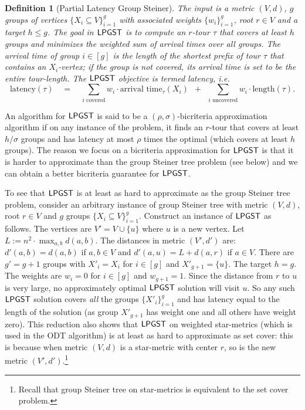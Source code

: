 \documentclass[11pt]{article}
\newtheorem{definition}{Definition}
\def\sse{\subseteq}
\def\odt{{\sf ODT}\xspace}
\def\lpgst{\ensuremath{{\sf LPGST}}\xspace}
\def\ts{\textstyle}
\begin{document}
\begin{definition}[Partial Latency Group Steiner]\label{def:lpgs} The input is 
a metric $(V,d)$, $g$ groups of vertices $\{X_i\sse V\}_{i=1}^g$ with associated weights
$\{w_i\}_{i=1}^g$, root $r\in V$ and a target $h\le g$. The goal in \lpgst is to compute an $r$-tour  $\tau$ 
that covers at least $h$ groups and minimizes the weighted sum of arrival times over all groups. The \emph{arrival  time} of group $i\in[g]$ is the length of the shortest prefix of tour   $\tau$ 
that contains an $X_i$-vertex; if the group is not covered, its arrival time is set to be the entire tour-length. The \lpgst objective  is termed {\em latency}, i.e. 
 \begin{equation}\label{eq:lpgs-obj}
  \ts \text{latency}(\tau) \quad = \quad \sum_{i \text{ covered}} w_i \cdot
  \text{arrival time}_{\tau}(X_i) \,\,\, +  \,\,\, \sum_{i \text{ uncovered}} w_i \cdot
  \text{length}(\tau).
\end{equation}
\end{definition}
\smallskip
An algorithm for \lpgst is said to be a  $(\rho,\sigma)$-bicriteria approximation algorithm if on any instance of the problem, it finds an $r$-tour that covers at least $h/\sigma$ groups and has latency at most $\rho$ times the optimal (which  covers at least $h$ groups). The reason we focus on a bicriteria approximation for \lpgst is that it is harder to approximate than the group Steiner tree problem (see below) and we can obtain  a better bicriteria guarantee for \lpgst. 

To see that \lpgst is at least as hard to approximate as the group Steiner tree problem, consider an arbitrary instance of group Steiner tree with metric $(V,d)$, root $r\in V$ and $g$ groups  $\{X_i\sse V\}_{i=1}^g$. Construct an instance of \lpgst as follows. The vertices are $V'=V\cup\{u\}$ where $u$ is a new vertex. Let $L:=n^2\cdot \max_{a,b} d(a,b)$. The distances in metric $(V',d')$ are: $d'(a,b)=d(a,b)$ if $a,b\in V$ and $d'(a,u)=L+d(a,r)$ if $a\in V$. 
There are $g'=g+1$ groups with $X'_i=X_i$ for $i\in [g]$ and $X'_{g+1}= \{u\}$. The target $h=g$. The weights are $w_i=0$ for $i\in[g]$ and $w_{g+1}=1$. Since the distance from $r$ to $u$ is very large, no approximately optimal \lpgst solution will visit $u$. So any such \lpgst solution covers {\em all} the groups $\{X'_i\}_{i=1}^g$ and has latency equal to the length of the solution (as group $X'_{g+1}$ has weight one  and all others have weight zero).  This reduction also shows that \lpgst on weighted star-metrics (which is used in the \odt algorithm) is at least as hard to approximate as set cover: this is because when  metric $(V,d)$ is a star-metric with center $r$, so is the  new metric $(V',d')$.\footnote{Recall that group Steiner tree on star-metrics is equivalent to the set cover problem.}   
\end{document}
